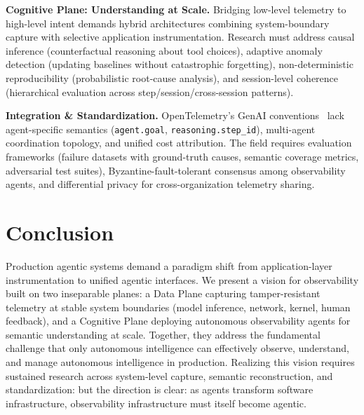 \documentclass[sigplan,screen,9pt]{acmart}
\begin{document}
\textbf{Cognitive Plane: Understanding at Scale.} Bridging low-level telemetry to high-level intent demands hybrid architectures combining system-boundary capture with selective application instrumentation. Research must address causal inference (counterfactual reasoning about tool choices), adaptive anomaly detection (updating baselines without catastrophic forgetting), non-deterministic reproducibility (probabilistic root-cause analysis), and session-level coherence (hierarchical evaluation across step/session/cross-session patterns).

\textbf{Integration \& Standardization.} OpenTelemetry's GenAI conventions~\cite{otelgenai,semconv} lack agent-specific semantics (\texttt{agent.goal}, \texttt{reasoning.step\_id}), multi-agent coordination topology, and unified cost attribution. The field requires evaluation frameworks (failure datasets with ground-truth causes, semantic coverage metrics, adversarial test suites), Byzantine-fault-tolerant consensus among observability agents, and differential privacy for cross-organization telemetry sharing.

\section{Conclusion}

Production agentic systems demand a paradigm shift from application-layer instrumentation to unified agentic interfaces. We present a vision for observability built on two inseparable planes: a Data Plane capturing tamper-resistant telemetry at stable system boundaries (model inference, network, kernel, human feedback), and a Cognitive Plane deploying autonomous observability agents for semantic understanding at scale. Together, they address the fundamental challenge that only autonomous intelligence can effectively observe, understand, and manage autonomous intelligence in production. Realizing this vision requires sustained research across system-level capture, semantic reconstruction, and standardization: but the direction is clear: as agents transform software infrastructure, observability infrastructure must itself become agentic.




\end{document}
